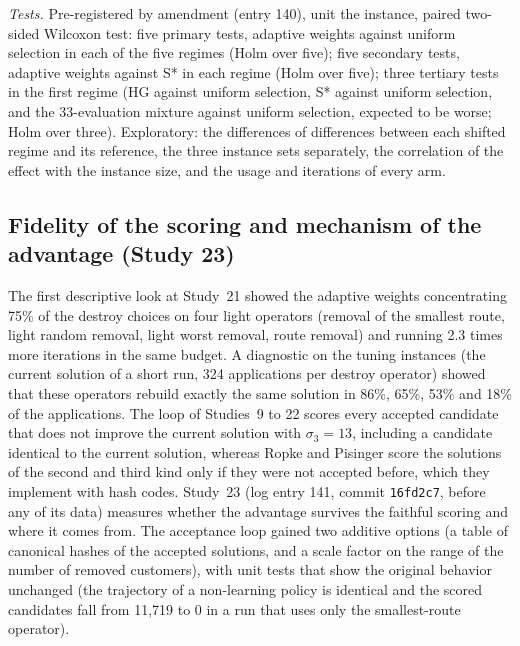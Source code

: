 \emph{Tests.} Pre-registered by amendment (entry 140), unit the instance, paired two-sided Wilcoxon test: five primary tests, adaptive weights against uniform selection in each of the five regimes (Holm over five); five secondary tests, adaptive weights against S* in each regime (Holm over five); three tertiary tests in the first regime (HG against uniform selection, S* against uniform selection, and the 33-evaluation mixture against uniform selection, expected to be worse; Holm over three). Exploratory: the differences of differences between each shifted regime and its reference, the three instance sets separately, the correlation of the effect with the instance size, and the usage and iterations of every arm.

\subsection{Fidelity of the scoring and mechanism of the advantage (Study 23)}\label{sec:s23design}
The first descriptive look at Study~21 showed the adaptive weights concentrating 75\% of the destroy choices on four light operators (removal of the smallest route, light random removal, light worst removal, route removal) and running 2.3 times more iterations in the same budget. A diagnostic on the tuning instances (the current solution of a short run, 324 applications per destroy operator) showed that these operators rebuild exactly the same solution in 86\%, 65\%, 53\% and 18\% of the applications. The loop of Studies~9 to 22 scores every accepted candidate that does not improve the current solution with $\sigma_3=13$, including a candidate identical to the current solution, whereas Ropke and Pisinger score the solutions of the second and third kind only if they were not accepted before, which they implement with hash codes. Study~23 (log entry 141, commit \texttt{16fd2c7}, before any of its data) measures whether the advantage survives the faithful scoring and where it comes from. The acceptance loop gained two additive options (a table of canonical hashes of the accepted solutions, and a scale factor on the range of the number of removed customers), with unit tests that show the original behavior unchanged (the trajectory of a non-learning policy is identical and the scored candidates fall from 11,719 to 0 in a run that uses only the smallest-route operator).

